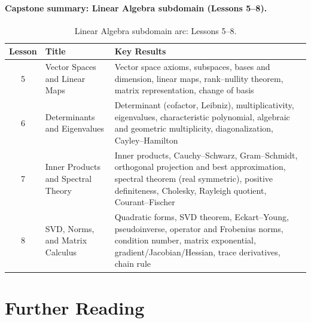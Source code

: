 \documentclass[11pt,a4paper]{article}
\begin{document}
\paragraph{Capstone summary: Linear Algebra subdomain (Lessons 5--8).}

\begin{table}[h]
\centering
\begin{tabular}{@{} c l p{7.2cm} @{}}
\toprule
\textbf{Lesson} & \textbf{Title} & \textbf{Key Results} \\
\midrule
5 & Vector Spaces and Linear Maps &
    Vector space axioms, subspaces, bases and dimension,
    linear maps, rank--nullity theorem, matrix representation,
    change of basis \\
6 & Determinants and Eigenvalues &
    Determinant (cofactor, Leibniz), multiplicativity,
    eigenvalues, characteristic polynomial, algebraic and
    geometric multiplicity, diagonalization, Cayley--Hamilton \\
7 & Inner Products and Spectral Theory &
    Inner products, Cauchy--Schwarz, Gram--Schmidt,
    orthogonal projection and best approximation, spectral
    theorem (real symmetric), positive definiteness, Cholesky,
    Rayleigh quotient, Courant--Fischer \\
8 & SVD, Norms, and Matrix Calculus &
    Quadratic forms, SVD theorem, Eckart--Young, pseudoinverse,
    operator and Frobenius norms, condition number, matrix
    exponential, gradient/Jacobian/Hessian, trace derivatives,
    chain rule \\
\bottomrule
\end{tabular}
\caption{Linear Algebra subdomain arc: Lessons 5--8.}
\label{tab:la_summary}
\end{table}

\section{Further Reading}
\label{sec:further_reading}
\end{document}
